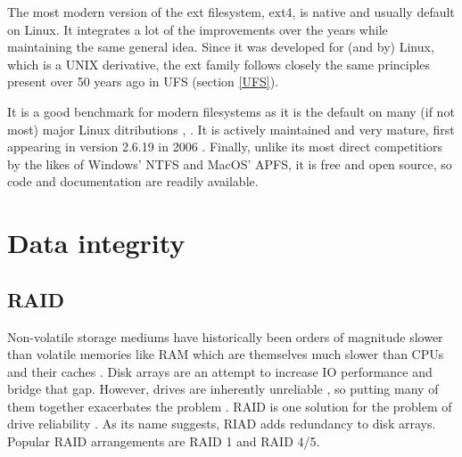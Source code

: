         The most modern version of the ext filesystem, ext4, is native and
        usually default on Linux. It integrates a lot of the improvements over
        the years while maintaining the same general idea. Since it was
        developed for (and by) Linux, which is a UNIX derivative, the ext
        family follows closely the same principles present over 50 years ago in
        UFS (section \ref{UFS}).

        It is a good benchmark for modern filesystems as it is the default on
        many (if not most) major Linux ditributions
        \cite{https://wiki.debian.org/FileSystem},
        \cite{https://access.redhat.com/documentation/en-us/red_hat_enterprise_linux/6/html/performance_tuning_guide/s-storage-fs}.
        It is actively maintained
        \cite{https://www.spinics.net/lists/linux-ext4/} and very mature, first
        appearing in version 2.6.19 in 2006
        \cite{http://www.h-online.com/open/features/Kernel-Log-Higher-and-Further-The-innovations-of-Linux-2-6-28-746805.html}.
        Finally, unlike its most direct competitiors by the likes of Windows'
        NTFS and MacOS' APFS, it is free and open source, so code and
        documentation are readily available.
    \section{Data integrity}

        \subsection{RAID}

            Non-volatile storage mediums have historically been orders of
            magnitude slower than volatile memories like RAM which are
            themselves much slower than CPUs and their caches \cite{raid has a
            Frank87, Stevens81}. Disk arrays are an attempt to increase IO
            performance and bridge that gap. However, drives are inherently
            unreliable \cite{pls (backblaze is a killer source)}, so putting
            many of them together exacerbates the problem \cite{maybe also
            raid. he has an MTTF caluclation}.  RAID is one solution for the
            problem of drive reliability \cite{RAID}. As its name suggests,
            RIAD adds redundancy to disk arrays. Popular RAID arrangements are
            RAID 1 and RAID 4/5.

